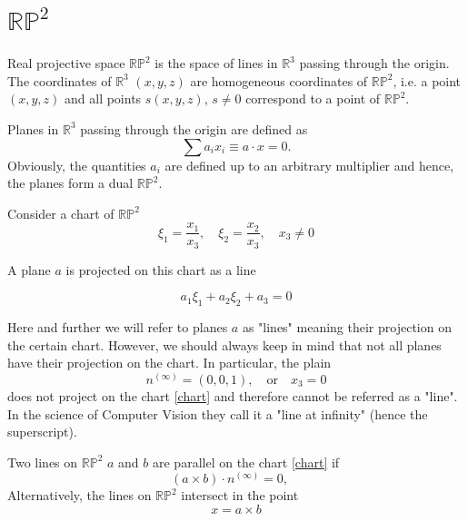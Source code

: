 \documentclass[a4paper,10pt]{article}
\begin{document}
\section{$\mathbb{RP}^2$ }
 Real projective space $\mathbb{RP}^2$ is the space of lines in $\mathbb{R}^{3}$ passing through the origin. The coordinates of $\mathbb{R}^3$ $(x,y,z)$ are homogeneous coordinates of $\mathbb{RP}^2$, i.e. a point $(x,y,z)$ and all points $s(x,y,z)$, $s\neq 0$ correspond to a point of $\mathbb{RP}^2$.  

Planes in $\mathbb{R}^3$ passing through the origin are defined as 
\begin{equation}
\sum a_i x_i \equiv a\cdot x= 0.
\end{equation}
 Obviously, the quantities $a_i$ are defined up to an arbitrary multiplier and hence, the planes form a dual $\mathbb{RP}^2$. 
 
 Consider a chart of $\mathbb{RP}^2$
 \begin{equation}
 \xi_1 = \frac{x_1}{x_3}, \quad \xi_2=\frac{x_2}{x_3}, \quad x_3\neq 0\label{chart}
 \end{equation}
 
A plane $a$ is projected on this chart as a line

\begin{equation}
a_1 \xi_1 + a_2 \xi_2 + a_3 = 0
\end{equation} 

Here and further we will refer to planes $a$ as "lines" meaning their projection on the certain chart. However, we should always keep in mind that not all planes have their projection on the chart. In particular, the plain 
\begin{equation}
n^{(\infty)} = (0,0,1), \quad \text{or} \quad x_3 = 0\label{z0}
\end{equation}
does not project on the chart \eqref{chart} and therefore cannot be referred as a "line". In the science of Computer Vision they call it a "line at infinity" (hence the superscript).

Two lines on $\mathbb{RP}^2$ $a$ and $b$ are parallel on the chart  \eqref{chart} if 
\begin{equation}
(a\times b )\cdot n^{(\infty)} = 0, \quad \label{parallel}
\end{equation}
Alternatively, the lines on $\mathbb{RP}^2$ intersect in the point 
\begin{equation}
x = a \times b\label{intersectionpoint}
\end{equation}
\end{document}
